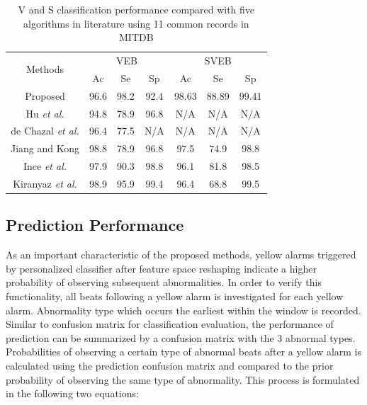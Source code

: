 {\begin{table}[tbp]
\centering
\caption{V and S classification performance compared with five algorithms in literature using 11 common records in MITDB}
\label{table:classification_comp}
\begin{tabular}{|c|c|c|c|c|c|c|}
\hline
\multirow{2}{*}{Methods} & \multicolumn{3}{c|}{VEB} & \multicolumn{3}{c|}{SVEB} \\ \cline{2-7} 
                         & Ac     & Se     & Sp     & Ac      & Se     & Sp     \\ \hline
Proposed                 & 96.6   & 98.2   & 92.4   & 98.63   & 88.89  & 99.41  \\ \hline
Hu \textit{et al.}\cite{Hu_et_al}     & 94.8   & 78.9   & 96.8   & N/A     & N/A    & N/A    \\ \hline
de Chazal \textit{et al.}\cite{autofs}  & 96.4   & 77.5   & N/A    & N/A     & N/A    & N/A    \\ \hline
Jiang and Kong \cite{bbnn}    & 98.8   & 78.9   & 96.8   & 97.5    & 74.9   & 98.8   \\ \hline
Ince \textit{et al.} \cite{ince2009generic}    & 97.9   & 90.3   & 98.8   & 96.1    & 81.8   & 98.5   \\ \hline
Kiranyaz \textit{et al.}\cite{Kiranyaz}         & 98.9   & 95.9   & 99.4   & 96.4    & 68.8   & 99.5   \\ \hline
\end{tabular}
\end{table}

\subsection{Prediction Performance}

As an important characteristic of the proposed methods, yellow alarms triggered by personalized classifier after feature space reshaping indicate a higher probability of observing subsequent abnormalities. In order to verify this functionality, all beats following a yellow alarm is investigated for each yellow alarm. Abnormality type which occurs the earliest within the window is recorded. Similar to confusion matrix for classification evaluation, the performance of prediction can be summarized by a confusion matrix with the 3 abnormal types. Probabilities of observing a certain type of abnormal beats after a yellow alarm is calculated using the prediction confusion matrix and compared to the prior probability of observing the same type of abnormality. This process is formulated in the following two equations:

}
